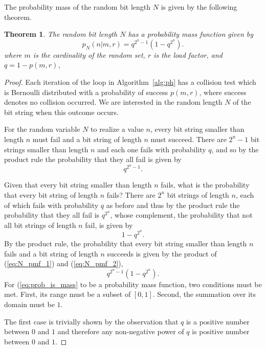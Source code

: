 \documentclass[hidelinks,11pt,final]{article}
\newcommand{\envnumstyle}{section}
\theoremstyle{plain}
\newtheorem{theorem}{Theorem}[\envnumstyle]
\begin{document}
The probability mass of the random bit length $N$ is given by the following theorem.
\begin{theorem}
\label{thm:N_pmf}
The random bit length $N$ has a probability mass function given by
\begin{equation}
\label{eq:N_pmf}
    p_N(n | m, r) = q^{2^n-1}\left(1 - q^{2^n}\right).
\end{equation}
where $m$ is the cardinality of the random set, $r$ is the load factor, and $q = 1 - p(m,r)$, 
\end{theorem}
\begin{proof}
Each iteration of the loop in Algorithm~\ref{alg:ph} has a collision test which is Bernoulli distributed with a probability of success $p(m,r)$, where success denotes no collision occurred. We are interested in the random length $N$ of the bit string when this outcome occurs.

For the random variable $N$ to realize a value $n$, every bit string smaller than length $n$ must fail and a bit string of length $n$ must succeed. There are $2^n-1$ bit strings smaller than length $n$ and each one fails with probability $q$, and so by the product rule the probability that they all fail is given by
\begin{equation}
\label{eq:N_pmf_1}
    q^{2^n - 1}.
\end{equation}

Given that every bit string smaller than length $n$ fails, what is the probability that every bit string of length $n$ fails? There are $2^n$ bit strings of length $n$, each of which fails with probability $q$ as before and thus by the product rule the probability that they all fail is $q^{2^n}$, whose complement, the probability that not all bit strings of length $n$ fail, is given by
\begin{equation}
\label{eq:N_pmf_2}
    1 - q^{2^n}.
\end{equation}
By the product rule, the probability that every bit string smaller than length $n$ fails and a bit string of length $n$ succeeds is given by the product of (\ref{eq:N_pmf_1}) and (\ref{eq:N_pmf_2}),
\begin{equation}
\label{eq:prob_is_mass}
    q^{2^n-1}\left(1 - q^{2^n}\right).
\end{equation}
For (\ref{eq:prob_is_mass} to be a probability mass function, two conditions must be met. First, its range must be a subset of $[0,1]$. Second, the summation over its domain must be $1$.

The first case is trivially shown by the observation that $q$ is a positive number between $0$ and $1$ and therefore any non-negative power of $q$ is positive number between $0$ and $1$.


\end{proof}
\end{document}
